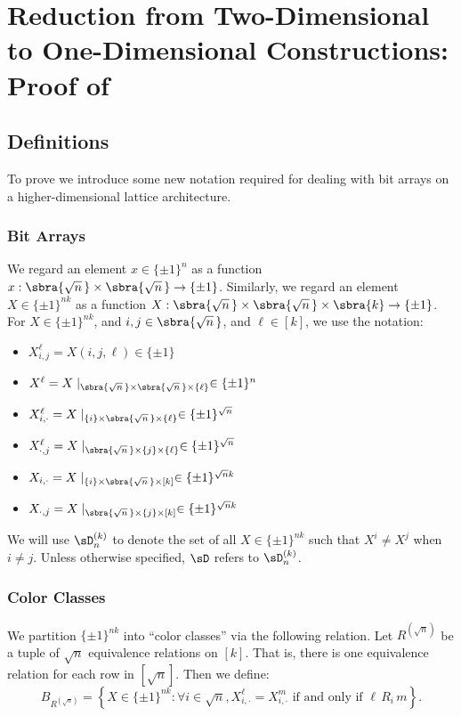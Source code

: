 \section{Reduction from Two-Dimensional to One-Dimensional Constructions: Proof of }\label{sec:proof of 2D to 1D reduction}

\subsection{Definitions}\label{sec:definitions}
To prove  we introduce some new notation required for dealing with bit arrays on a higher-dimensional lattice architecture. 
\subsubsection{Bit Arrays}
We regard an element $x\in \{\pm1\}^{n}$ as a function $x : \sbra{\sqrt{n}\,} \times \sbra{\sqrt{n}\,} \to \{\pm1\}$. 
Similarly, we regard an element $X \in \{\pm1\}^{nk}$ as a function $X : \sbra{\sqrt{n}\,} \times \sbra{\sqrt{n}\,} \times \sbra{k} \to \{\pm1\}$. 
For $X \in \{\pm1\}^{nk}$, and $i,j \in \sbra{\sqrt{n}\,}$, and $\ell \in [k]$, we use the notation:
\begin{itemize}
    \item $X^\ell_{i, j} = X(i, j, \ell) \in \{\pm1\}$
    \item $X^\ell = X \mid_{\sbra{\sqrt{n}\,} \times \sbra{\sqrt{n}\,} \times \{\ell\}} \in \{\pm1\}^{n}$
    \item $X^\ell_{i, \cdot} = X \mid_{\{i\} \times \sbra{\sqrt{n}\,} \times \{\ell\}} \in \{\pm1\}^{\sqrt{n}}$
    \item $X^\ell_{\cdot, j} = X \mid_{\sbra{\sqrt{n}\,} \times \{j\} \times \{\ell\}} \in \{\pm1\}^{\sqrt{n}}$
    \item $X_{i, \cdot} = X \mid_{\{i\} \times \sbra{\sqrt{n}\,} \times [k]} \in \{\pm1\}^{\sqrt{n}k}$
    \item $X_{\cdot, j} = X \mid_{\sbra{\sqrt{n}\,} \times \{j\} \times [k]} \in \{\pm1\}^{\sqrt{n}k}$
\end{itemize}
We will use $\sD_n^{(k)}$ to denote the set of all $X \in \{\pm1\}^{nk}$ such that $X^i \ne X^j$ when $i \ne j$. Unless otherwise specified, $\sD$ refers to $\sD_{n}^{(k)}$.

\subsubsection{Color Classes}
\label{sec:colorclasses}
We partition $\{\pm1\}^{nk}$ into ``color classes'' via the following relation. Let $R^{(\sqrt{n})}$ be a tuple of $\sqrt{n}$ equivalence relations on $[k]$. That is, there is one equivalence relation for each row in $[\sqrt{n}]$. Then we define:
\begin{equation*}
        B_{R^{(\sqrt{n})}} = \left\{ X \in \{\pm1\}^{nk} : \forall i \in \sqrt{n}, X_{i, \cdot}^\ell = X_{i, \cdot}^m \text{ if and only if } \ell \,R_i\, m \right\}.
\end{equation*}

